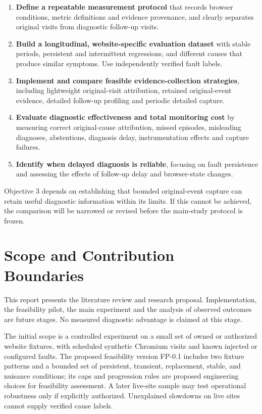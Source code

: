 \begin{enumerate}
  \item \textbf{Define a repeatable measurement protocol} that records browser conditions, metric definitions and evidence provenance, and clearly separates original visits from diagnostic follow-up visits.
  \item \textbf{Build a longitudinal, website-specific evaluation dataset} with stable periods, persistent and intermittent regressions, and different causes that produce similar symptoms. Use independently verified fault labels.
  \item \textbf{Implement and compare feasible evidence-collection strategies}, including lightweight original-visit attribution, retained original-event evidence, detailed follow-up profiling and periodic detailed capture.
  \item \textbf{Evaluate diagnostic effectiveness and total monitoring cost} by measuring correct original-cause attribution, missed episodes, misleading diagnoses, abstentions, diagnosis delay, instrumentation effects and capture failures.
  \item \textbf{Identify when delayed diagnosis is reliable}, focusing on fault persistence and assessing the effects of follow-up delay and browser-state changes.
\end{enumerate}

Objective 3 depends on establishing that bounded original-event capture can retain useful diagnostic information within its limits. If this cannot be achieved, the comparison will be narrowed or revised before the main-study protocol is frozen.

\section{Scope and Contribution Boundaries}

This report presents the literature review and research proposal. Implementation, the feasibility pilot, the main experiment and the analysis of observed outcomes are future stages. No measured diagnostic advantage is claimed at this stage.

The initial scope is a controlled experiment on a small set of owned or authorized website fixtures, with scheduled synthetic Chromium visits and known injected or configured faults. The proposed feasibility version FP-0.1 includes two fixture patterns and a bounded set of persistent, transient, replacement, stable, and nuisance conditions; its caps and progression rules are proposed engineering choices for feasibility assessment. A later live-site sample may test operational robustness only if explicitly authorized. Unexplained slowdowns on live sites cannot supply verified cause labels.

